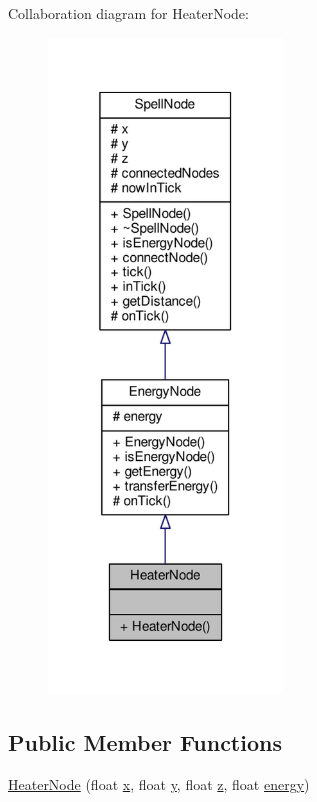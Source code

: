 Collaboration diagram for Heater\-Node\-:
\nopagebreak
\begin{figure}[H]
\begin{center}
\leavevmode
\includegraphics[width=176pt]{class_heater_node__coll__graph}
\end{center}
\end{figure}
\subsection*{Public Member Functions}
\begin{DoxyCompactItemize}
\item 
\hyperlink{class_heater_node_a7c6998949929f0a43dc8e8e588a53cc0}{Heater\-Node} (float \hyperlink{class_spell_node_a916f2a709a674dd2a61530b6acc339cc}{x}, float \hyperlink{class_spell_node_a754d80fd0fd82dbc12443b5f277b9fb4}{y}, float \hyperlink{class_spell_node_aff090331ff1bd816a22e974a50c1a180}{z}, float \hyperlink{class_energy_node_ac2cd46828178316e24f339489f553852}{energy})
\end{DoxyCompactItemize}
